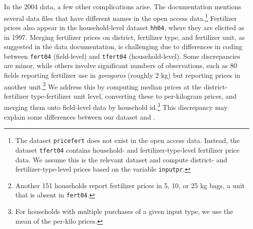 \documentclass[12pt]{article}
\theoremstyle{plain}
\theoremstyle{definition}
\begin{document}
In the 2004 data, a few other complications arise.
The documentation mentions several data files that have different names in the open access data.\footnote{The dataset \texttt{pricefert} does not exist in the open access data. Instead, the dataset \texttt{tfert04} contains household- and fertilizer-type-level fertilizer price data.
We assume this is the relevant dataset and compute district- and fertilizer-type-level prices based on the variable \texttt{inputpr}.}
Fertilizer prices also appear in the household-level dataset \texttt{hh04}, where they are elicited as in 1997.
Merging fertilizer prices on district, fertilizer type, and fertilizer unit, as suggested in the data documentation, is challenging due to differences in coding between \texttt{fert04} (field-level) and \texttt{tfert04} (household-level).
Some discrepancies are minor, while others involve significant numbers of observations, such as 80 fields reporting fertilizer use in \textit{gorogoros} (roughly 2 kg) but reporting prices in another unit.\footnote{Another 151 households report fertilizer prices in 5, 10, or 25 kg bags, a unit that is absent in \texttt{fert04}.}
We address this by computing median prices at the district-fertilizer type-fertilizer unit level, converting these to per-kilogram prices, and merging them onto field-level data by household id.\footnote{For households with multiple purchases of a given input type, we use the mean of the per-kilo prices.}
This discrepancy may explain some differences between our dataset and \citet{S2011}.

\landscape

\end{document}
